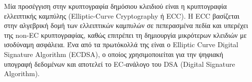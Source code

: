  Μία προσέγγιση στην κρυπτογραφία δημόσιου κλειδιού είναι η κρυπτογραφία ελλειπτικής καμπύλης (Elliptic-Curve Cryptography ή ECC). Η ECC βασίζεται στην αλγεβρική δομή των ελλειπτικών καμπυλών σε πεπερασμένα πεδία και υπερέχει της non-EC κρυπτογραφίας, καθώς επιτρέπει τη δημιουργία μικρότερων κλειδιών με ισοδύναμη ασφάλεια. Ένα από τα πρωτόκολλά της είναι ο Elliptic Curve Digital Signature Algorithm (ECDSA), ο οποίος χρησιμοποιείται για την ψηφιακή υπογραφή δεδομένων και αποτελεί το EC-ανάλογο του DSA (Digital Signature Algorithm).\cite{2.2-ecdsa}